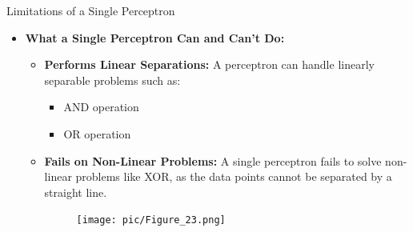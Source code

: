 \documentclass[serif, aspectratio=169]{beamer}
\begin{document}
\begin{frame}{Limitations of a Single Perceptron}
    \begin{itemize}
        \item \textbf{What a Single Perceptron Can and Can't Do:}
        \medskip
        \begin{itemize}\itemsep1em
            \item \justifying \textbf{Performs Linear Separations:}
            A perceptron can handle linearly separable problems such as:
            \begin{itemize}
                \item AND operation
                \item OR operation
            \end{itemize}
            \item \justifying \textbf{Fails on Non-Linear Problems:}
            A single perceptron fails to solve non-linear problems like XOR, as the data points cannot be separated by a straight line.
            \endminipage
            \hfill
            \begin{figure}
                \centering
                \texttt{[image: pic/Figure\_23.png]}
            \end{figure}
            \endminipage
        \end{itemize}
    \end{itemize}
\end{frame}
\end{document}

